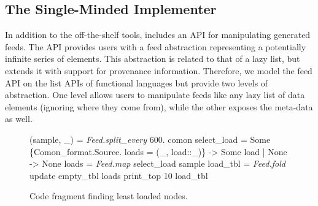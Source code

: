 

\subsection{The Single-Minded Implementer}

In addition to the off-the-shelf tools, \padsd{} includes an API for
manipulating generated feeds. The API provides 
users with a feed abstraction representing a potentially infinite
series of elements. This abstraction is related to that of a lazy
list, but extends it with support for provenance information. 
Therefore, we model the feed API on the
list APIs of functional languages
but provide two levels of abstraction. One level allows users to
manipulate feeds like any lazy list of data elements (ignoring
where they come from), while the other exposes the meta-data as well. 



\begin{figure}[t]
\begin{codebox}
 (sample, \_) = \textit{Feed.split_every} 600. comon 
 select_load = 
    Some \{Comon_format.Source.
          loads = (_, load::_)\} -> Some load
  | None -> None 
 loads    = \textit{Feed.map} select_load sample 
 load_tbl = \textit{Feed.fold} update empty_tbl loads 
  print_top 10 load_tbl
\end{codebox}
  \caption{Code fragment finding least loaded \planetlab nodes.}
\label{fig:sample-loads}
\shrink
\end{figure}



